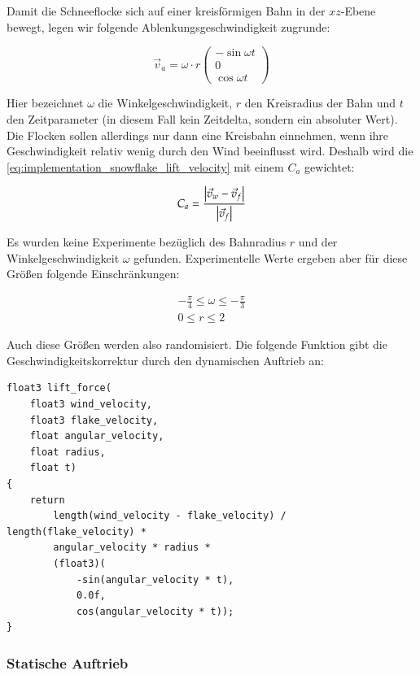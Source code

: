Damit die Schneeflocke sich auf einer kreisförmigen Bahn in der
$xz$-Ebene bewegt, legen wir folgende Ablenkungsgeschwindigkeit zugrunde:

\begin{equation}
\label{eq:implementation_snowflake_lift_velocity}
\vec{v}_{a} =
\omega \cdot r
\left(
\begin{array}{c}
-\sin{\omega t} \\
0 \\
\cos{\omega t}
\end{array}
\right)
\end{equation}

Hier bezeichnet $\omega$ die Winkelgeschwindigkeit, $r$ den
Kreisradius der Bahn und $t$ den Zeitparameter (in diesem Fall kein
Zeitdelta, sondern ein absoluter Wert). Die Flocken sollen allerdings
nur dann eine Kreisbahn einnehmen, wenn ihre Geschwindigkeit relativ
wenig durch den Wind beeinflusst wird. Deshalb wird die
\autoref{eq:implementation_snowflake_lift_velocity} mit einem $C_a$
gewichtet:

\begin{equation}
C_a =
\frac
{
  \left|\vec{v}_w - \vec{v}_f\right|
}
{
  \left|\vec{v}_f\right|
}
\end{equation}

Es wurden keine Experimente bezüglich des Bahnradius $r$ und der
Winkelgeschwindigkeit $\omega$ gefunden. Experimentelle Werte ergeben
aber für diese Größen folgende Einschränkungen:

\begin{gather}
-\frac{\pi}{4} \leq \omega \leq -\frac{\pi}{3} \\
0 \leq r \leq 2
\end{gather}

Auch diese Größen werden also randomisiert. Die folgende Funktion gibt
die Geschwindigkeitskorrektur durch den dynamischen Auftrieb an:

\begin{verbatim}
float3 lift_force(
    float3 wind_velocity,
    float3 flake_velocity,
    float angular_velocity,
    float radius,
    float t)
{
    return
        length(wind_velocity - flake_velocity) / length(flake_velocity) *
        angular_velocity * radius *
        (float3)(
            -sin(angular_velocity * t),
            0.0f,
            cos(angular_velocity * t));
}
\end{verbatim}

\subsubsection{Statische Auftrieb}

